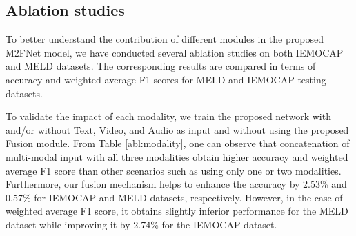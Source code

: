 \documentclass[10pt,twocolumn,letterpaper]{article}
\begin{document}
\begin{table}[t!]
\caption{Ablation Studies based comparison to validate the impact of multi-head attention fusion layers.}
\label{abl:fusion}
\end{table}

\subsection{Ablation studies}
To better understand the contribution of different modules in the proposed M2FNet model, we have conducted several ablation studies on both IEMOCAP and MELD datasets. 
The corresponding results are compared in terms of accuracy and weighted average F1 scores for MELD and IEMOCAP testing datasets.

To validate the impact of each modality, we train the proposed network with and/or without Text, Video, and Audio as input and without using the proposed Fusion module. From Table \ref{abl:modality}, one can observe that concatenation of multi-modal input with all three modalities obtain higher accuracy and weighted average F1 score than other scenarios such as using only one or two modalities.
Furthermore, our fusion mechanism helps to enhance the accuracy by 2.53\% and 0.57\% for IEMOCAP and MELD datasets, respectively. However, in the case of weighted average F1 score, it obtains slightly inferior performance for the MELD dataset while improving it by 2.74\% for the IEMOCAP dataset. 
\end{document}
